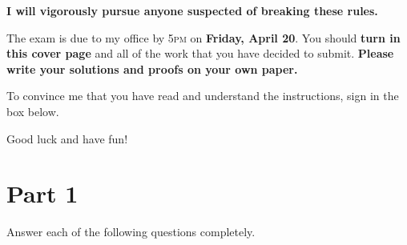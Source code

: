 \documentclass[11pt]{article}
\theoremstyle{definition}
\begin{document}
\begin{center}
\textbf{I will vigorously pursue anyone suspected of breaking these rules.}
\end{center}

\bigskip

The exam is due to my office by 5\textsc{pm} on \textbf{Friday, April 20}.  You should \textbf{turn in this cover page} and all of the work that you have decided to submit. \textbf{Please write your solutions and proofs on your own paper.}

\bigskip

To convince me that you have read and understand the instructions, sign in the box below.

\bigskip


\bigskip

Good luck and have fun!

\newpage

\section*{Part 1}

Answer each of the following questions completely.
\end{document}
